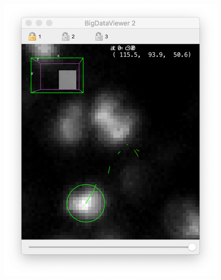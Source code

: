 \begin{figure}
    \centering
    \null\hfill
    \includegraphics[height=0.2\textheight]{figures/Mastodon_Tracklets_01.png}
    \hfill

\end{figure}
